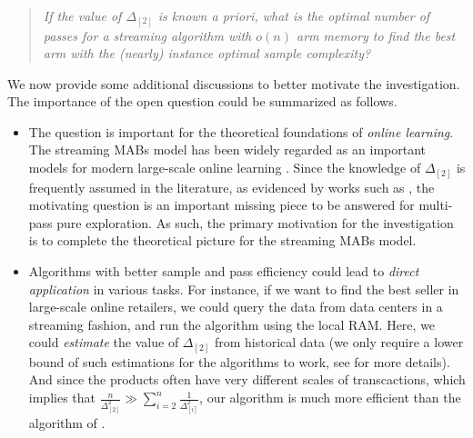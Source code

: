 \begin{quote}
	\centering
	\it If the value of $\Delta_{[2]}$ is known \emph{a priori}, what is the optimal number of passes for a streaming algorithm with $o(n)$ arm memory to find the best arm with the (nearly) instance optimal sample complexity?
\end{quote}

We now provide some additional discussions to better motivate the investigation. The importance of the open question could be summarized as follows.
\begin{itemize}
\item The question is important for the theoretical foundations of \emph{online learning}. The streaming MABs model has been widely regarded as an important models for modern large-scale online learning \cite{MaitiPK21,JinH0X21,AWneurips22,AgarwalKP22,Wang23Regret,LZWL23,AW23BestArm}. Since the knowledge of $\Delta_{[2]}$ is frequently assumed in the literature, as evidenced by works such as \cite{Even-Dar+02,AssadiW20}, the motivating question is an important missing piece to be answered for multi-pass pure exploration. As such, the primary motivation for the investigation is to complete the theoretical picture for the streaming MABs model.
\item Algorithms with better sample and pass efficiency could lead to \emph{direct application} in various tasks. For instance, if we want to find the best seller in large-scale online retailers, we could query the data from data centers in a streaming fashion, and run the algorithm using the local RAM. Here, we could \emph{estimate} the value of $\Delta_{[2]}$ from historical data (we only require a lower bound of such estimations for the algorithms to work, see  for more details). And since the products often have very different scales of transcactions, which implies that $\frac{n}{\Delta^2_{[2]}}\gg \sum_{i=2}^{n}\frac{1}{\Delta^2_{[i]}}$, our algorithm is much more efficient than the algorithm of \cite{AssadiW20,JinH0X21}.
\end{itemize}


